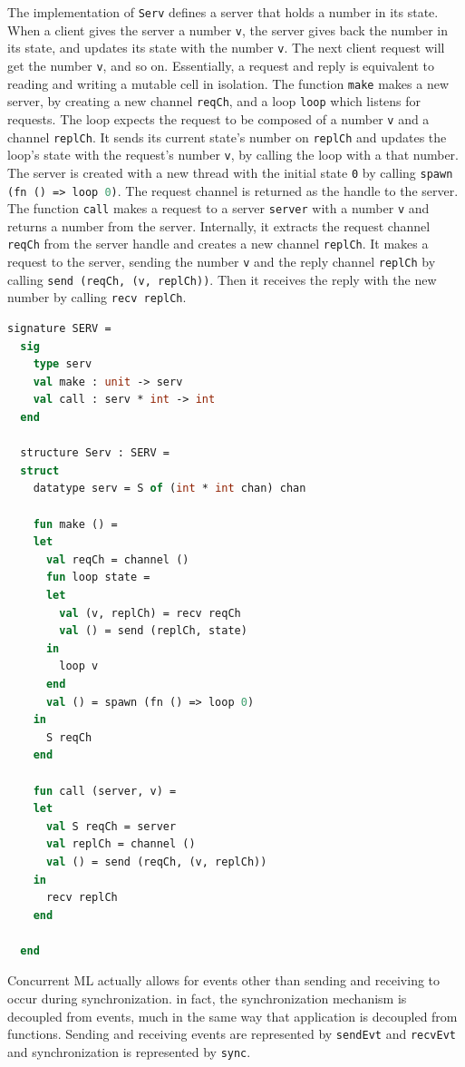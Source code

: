 \documentclass[letterpaper, 11pt]{extarticle}
\begin{document}
The implementation of \lstinline{Serv} defines a server that holds a number in its state.
When a client gives the server a number \lstinline{v}, the server gives back the number in
its state, and updates its state with the number \lstinline{v}. The next client request will
get the number \lstinline{v}, and so on. Essentially, a request and reply is equivalent
to reading and writing a mutable cell in isolation. The function \lstinline{make} makes a new
server, by creating a new channel \lstinline{reqCh}, and a loop \lstinline{loop} which listens
for requests. The loop expects the request to be composed of a number \lstinline{v} and a
channel \lstinline{replCh}. It sends its current state's number on \lstinline{replCh} and
updates the loop's state with the request's number \lstinline{v}, by calling the loop with a
that number. The server is created with a new thread with the initial state \lstinline{0}
by calling \lstinline[language=ML]{spawn (fn () => loop 0)}. The request channel is returned
as the handle to the server. The function \lstinline{call} makes a request to a server
\lstinline{server} with a number \lstinline{v} and returns a number from the
server. Internally, it extracts the request channel \lstinline{reqCh} from the
server handle and creates a new channel \lstinline{replCh}. It makes a request to the server,
sending the number \lstinline{v} and the reply channel \lstinline{replCh} by calling
\lstinline{send (reqCh, (v, replCh))}. Then it receives the reply with the new number by
calling \lstinline{recv replCh}.


\begin{lstlisting}[language=ML, mathescape]
  signature SERV =
  sig 
    type serv
    val make : unit -> serv
    val call : serv * int -> int
  end

  structure Serv : SERV =
  struct 
    datatype serv = S of (int * int chan) chan

    fun make () =
    let 
      val reqCh = channel ()
      fun loop state =
      let
        val (v, replCh) = recv reqCh
        val () = send (replCh, state)
      in
        loop v
      end
      val () = spawn (fn () => loop 0)
    in
      S reqCh
    end 

    fun call (server, v) =
    let 
      val S reqCh = server
      val replCh = channel () 
      val () = send (reqCh, (v, replCh))
    in
      recv replCh
    end

  end
\end{lstlisting}


Concurrent ML actually allows for events other than sending and receiving to
occur during synchronization. in fact, the synchronization mechanism is decoupled from
events, much in the same way that application is decoupled
from functions. Sending and receiving events are represented by \lstinline{sendEvt}
and \lstinline{recvEvt} and synchronization is represented by \lstinline{sync}.
\end{document}
